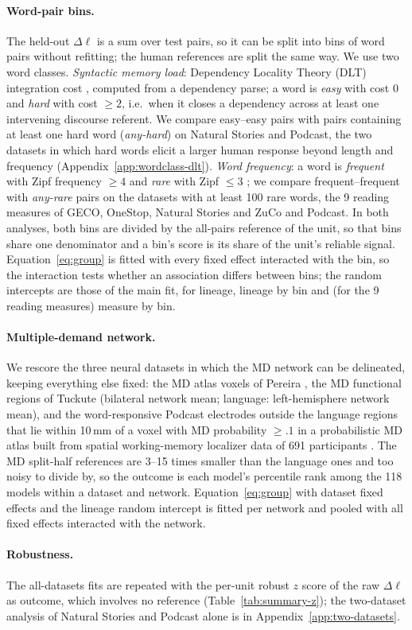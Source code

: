 \paragraph{Word-pair bins.} The held-out $\Delta\ell$ is a sum over test pairs, so it can be split into bins of word pairs without refitting; the human references are split the same way. We use two word classes. \emph{Syntactic memory load}: Dependency Locality Theory (DLT) integration cost \citep{gibson2000dlt}, computed from a dependency parse; a word is \emph{easy} with cost 0 and \emph{hard} with cost $\geq2$, i.e.\ when it closes a dependency across at least one intervening discourse referent. We compare easy--easy pairs with pairs containing at least one hard word (\emph{any-hard}) on Natural Stories and Podcast, the two datasets in which hard words elicit a larger human response beyond length and frequency (Appendix~\ref{app:wordclass-dlt}). \emph{Word frequency}: a word is \emph{frequent} with Zipf frequency $\geq4$ and \emph{rare} with Zipf $\leq3$ \citep{vanheuven2014subtlex}; we compare frequent--frequent with \emph{any-rare} pairs on the datasets with at least 100 rare words, the 9 reading measures of GECO, OneStop, Natural Stories and ZuCo and Podcast. In both analyses, both bins are divided by the all-pairs reference of the unit, so that bins share one denominator and a bin's score is its share of the unit's reliable signal. Equation~\ref{eq:group} is fitted with every fixed effect interacted with the bin, so the interaction tests whether an association differs between bins; the random intercepts are those of the main fit, for lineage, lineage by bin and (for the 9 reading measures) measure by bin.

\paragraph{Multiple-demand network.} We rescore the three neural datasets in which the MD network can be delineated, keeping everything else fixed: the MD atlas voxels of Pereira \citep{pereira2018toward}, the MD functional regions of Tuckute (bilateral network mean; language: left-hemisphere network mean), and the word-responsive Podcast electrodes outside the language regions that lie within 10\,mm of a voxel with MD probability $\geq.1$ in a probabilistic MD atlas built from spatial working-memory localizer data of 691 participants \citep{lipkin2022probabilistic,lipkin2023mdtom}. The MD split-half references are 3--15 times smaller than the language ones and too noisy to divide by, so the outcome is each model's percentile rank among the 118 models within a dataset and network. Equation~\ref{eq:group} with dataset fixed effects and the lineage random intercept is fitted per network and pooled with all fixed effects interacted with the network.

\paragraph{Robustness.} The all-datasets fits are repeated with the per-unit robust $z$ score of the raw $\Delta\ell$ as outcome, which involves no reference (Table~\ref{tab:summary-z}); the two-dataset analysis of Natural Stories and Podcast alone is in Appendix~\ref{app:two-datasets}.
